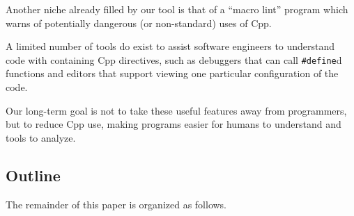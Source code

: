 \documentclass[11pt]{article}
\begin{document}


%


Another niche already filled by our tool is that of a ``macro lint''
program which warns of potentially dangerous (or non-standard) uses of
Cpp.







A limited number of tools do exist to assist software engineers to
understand code with containing Cpp directives, such as debuggers that can
call {\tt \#define}d functions and editors that support viewing one
particular configuration of the code.

Our long-term goal is not to take these useful features away from
programmers, but to reduce Cpp use, making programs easier for humans to
understand and tools to analyze.


\subsection{Outline}

The remainder of this paper is organized as follows.
\end{document}
